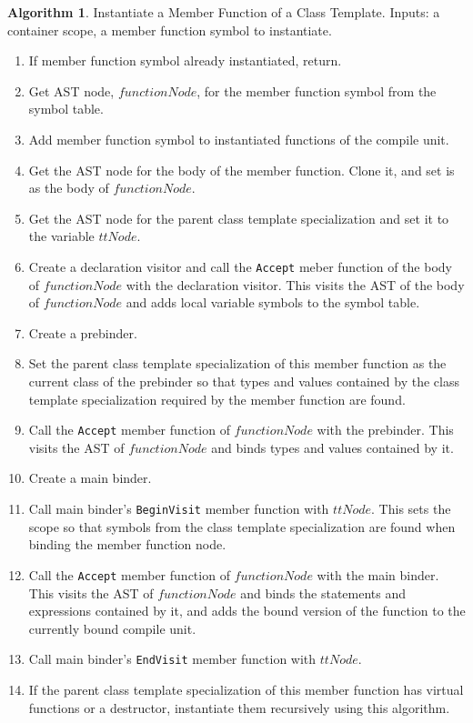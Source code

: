 \documentclass[a4paper,oneside,11pt]{book}
\theoremstyle{definition}
\newtheorem{algo}{Algorithm}[section]
\begin{document}
\begin{algo}\label{instantiatememfunofclasstemplate} Instantiate a Member Function of a Class Template. Inputs: a container scope,
a member function symbol to instantiate.
\begin{enumerate}
\item
If member function symbol already instantiated, return.
\item
Get AST node, $functionNode$, for the member function symbol from the symbol table.
\item
Add member function symbol to instantiated functions of the compile unit.
\item
Get the AST node for the body of the member function. Clone it, and set is as the body of $functionNode$.
\item
Get the AST node for the parent class template specialization and set it to the variable $ttNode$.
\item
Create a declaration visitor and call the \verb|Accept| meber function of the body of $functionNode$ with the declaration visitor.
This visits the AST of the body of $functionNode$ and adds local variable symbols to the symbol table.
\item
Create a prebinder.
\item
Set the parent class template specialization of this member function as the current class of the prebinder so that
types and values contained by the class template specialization required by the member function are found.
\item
Call the \verb|Accept| member function of $functionNode$ with the prebinder.
This visits the AST of $functionNode$ and binds types and values contained by it.
\item
Create a main binder.
\item
Call main binder's \verb|BeginVisit| member function with $ttNode$.
This sets the scope so that symbols from the class template specialization are found when binding the member function node.
\item
Call the \verb|Accept| member function of $functionNode$ with the main binder.
This visits the AST of $functionNode$ and binds the statements and expressions contained by it,
and adds the bound version of the function to the currently bound compile unit.
\item
Call main binder's \verb|EndVisit| member function with $ttNode$.
\item
If the parent class template specialization of this member function has virtual functions or a destructor,
instantiate them recursively using this algorithm.
\end{enumerate}
\end{algo}
\end{document}
